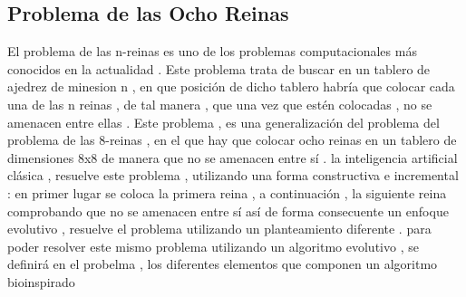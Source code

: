 \documentclass{article}
\begin{document}
\subsection{Problema de las Ocho Reinas}
El problema de las n-reinas es uno de los problemas computacionales más conocidos en la actualidad . Este problema trata de buscar en un tablero de ajedrez de minesion n , en que posición de dicho tablero habría que colocar cada una de las n reinas , de tal manera , que una vez que estén colocadas , no se amenacen entre ellas . Este problema , es una generalización del problema del problema de las 8-reinas , en el que hay que colocar ocho reinas en un tablero de dimensiones 8x8 de manera que no se amenacen entre sí .
la inteligencia artificial clásica , resuelve este problema , utilizando una forma constructiva e incremental : en primer lugar se coloca la primera reina , a continuación , la siguiente reina comprobando que no se amenacen entre sí así de forma consecuente
un enfoque evolutivo , resuelve el problema utilizando un planteamiento diferente . para poder resolver este mismo problema utilizando un algoritmo evolutivo , se definirá en  el probelma , los diferentes elementos que componen un algoritmo bioinspirado 
\end{document}
